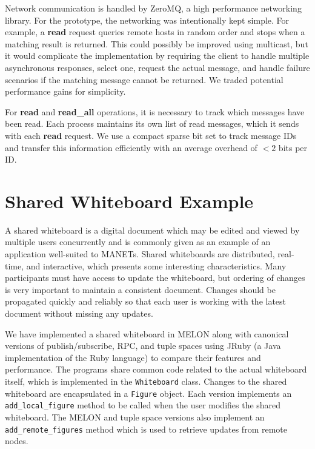 \documentclass{llncs}
\begin{document}
Network communication is handled by ZeroMQ\cite{hintjens2013zeromq}, a high performance networking library. For the prototype, the networking was intentionally kept simple. For example, a \textbf{read} request queries remote hosts in random order and stops when a matching result is returned. This could possibly be improved using multicast, but it would complicate the implementation by requiring the client to handle multiple asynchronous responses, select one, request the actual message, and handle failure scenarios if the matching message cannot be returned. We traded potential performance gains for simplicity.

For \textbf{read} and \textbf{read\_all} operations, it is necessary to track which messages have been read. Each process maintains its own list of read messages, which it sends with each \textbf{read} request. We use a compact sparse bit set to track message IDs and transfer this information efficiently with an average overhead of $<2$ bits per ID.

\section{Shared Whiteboard Example}\label{sec:wb}

A shared whiteboard is a digital document which may be edited and viewed by multiple users concurrently and is commonly given as an example of an application well-suited to MANETs\cite{wb6}. Shared whiteboards are distributed, real-time, and interactive, which presents some interesting characteristics. Many participants must have access to update the whiteboard, but ordering of changes is very important to maintain a consistent document. Changes should be propagated quickly and reliably so that each user is working with the latest document without missing any updates.

We have implemented a shared whiteboard in MELON along with canonical versions of publish/subscribe, RPC, and tuple spaces using JRuby (a Java implementation of the Ruby language) to compare their features and performance. The programs share common code related to the actual whiteboard itself, which is implemented in the \texttt{Whiteboard} class. Changes to the shared whiteboard are encapsulated in a \texttt{Figure} object. Each version implements an \texttt{add\_local\_figure} method to be called when the user modifies the shared whiteboard. The MELON and tuple space versions also implement an \texttt{add\_remote\_figures} method which is used to retrieve updates from remote nodes.
\end{document}
